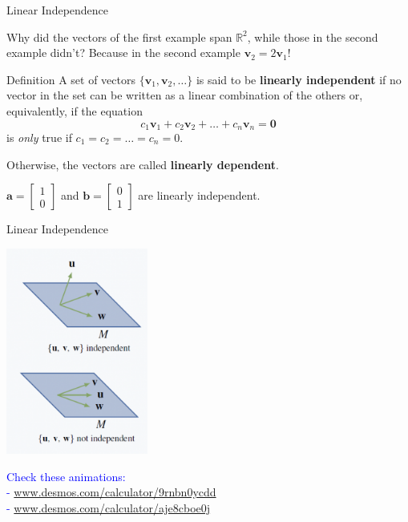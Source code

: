 \documentclass{beamer}
\newcommand{\va}{\mathbf{a}}
\newcommand{\vb}{\mathbf{b}}
\newcommand{\vv}{\mathbf{v}}
\newcommand{\R}{\mathbb{R}}
\begin{document}
\begin{frame}{Linear Independence}

Why did the vectors of the first example span $\R^2$, while those in the second example didn't? \pause Because in the second example $\vv_2=2\vv_1$! \pause

    \begin{block}{Definition}
         A set of vectors $\{\vv_1, \vv_2, \ldots\}$ is said to be \textbf{linearly independent} if no vector in the set can be written as a linear combination of the others \pause or, equivalently, if the equation
    \[
    c_1\vv_1 + c_2\vv_2 + \ldots + c_n\vv_n = \mathbf{0}
    \]
    is \textit{only} true if $c_1 = c_2 = \ldots = c_n = 0$.

\pause
    Otherwise, the vectors are called \textbf{linearly dependent}.
    \end{block}
    
    \pause\begin{example}
        $\va=\begin{bmatrix}
            1\\0
        \end{bmatrix}$ and $\vb=\begin{bmatrix}
            0\\1
        \end{bmatrix}$ are linearly independent.
    \end{example}
\end{frame}


\begin{frame}{Linear Independence}

      \begin{center}
    \includegraphics[width=0.35\textwidth, keepaspectratio]{lin-indep.png}
  \end{center}
  
       \textcolor{blue}{Check these animations:\\ - \url{www.desmos.com/calculator/9rnbn0ycdd}\\ - \url{www.desmos.com/calculator/aje8cboe0j} }
\end{frame}
\end{document}
